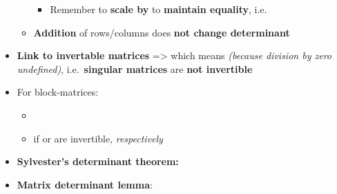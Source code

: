 \begin{itemize}
\begin{itemize}
                \begin{itemize}

                  \item
                        Remember to \textbf{scale by } to
                        \textbf{maintain equality},
                        i.e.~
                \end{itemize}
          \item
                \textbf{Addition} of rows/columns does \textbf{not change
                  determinant}
        \end{itemize}
  \item
        \textbf{Link to invertable matrices} =\textgreater{}
         which means
         \emph{(because
          division by zero undefined)}, i.e.~\textbf{singular matrices} are
        \textbf{not invertible}
  \item
        For block-matrices:

        \begin{itemize}

          \item
          \item
                if  or  are invertible, \emph{respectively}
        \end{itemize}
  \item
        \textbf{Sylvester's determinant theorem:}
  \item
        \textbf{Matrix determinant lemma}:

        \begin{itemize}


\end{itemize}
\end{itemize}
